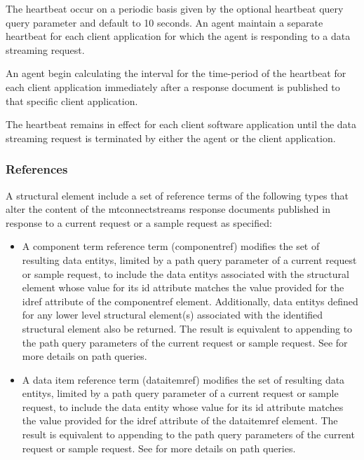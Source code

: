 The \gls{heartbeat} \MUST occur on a periodic basis given by the optional \gls{heartbeat query} query parameter and \MUST default to 10 seconds.  An \gls{agent} \MUST maintain a separate \gls{heartbeat} for each client application for which the \gls{agent} is responding to a \gls{data streaming} \gls{request}.

An \gls{agent} \MUST begin calculating the interval for the time-period of the \gls{heartbeat} for each client application immediately after a \gls{response document} is published to that specific client application.

The \gls{heartbeat} remains in effect for each client software application until the \gls{data streaming} \gls{request} is terminated by either the \gls{agent} or the client application.


\subsubsection{References}
\label{sec:References}

A \gls{structural element} \MAY include a set of \glspl{reference term} of the following types that \MAY alter the content of the \glspl{mtconnectstreams response document} published in response to a \gls{current request} or a \gls{sample request} as specified:

\begin{itemize}
\item A \gls{component term} \gls{reference term} (\gls{componentref}) modifies the set of resulting \glspl{data entity}, limited by a path query parameter of a \gls{current request} or \gls{sample request}, to include the \glspl{data entity} associated with the \gls{structural element} whose value for its \gls{id} attribute matches the value provided for the \gls{idref} attribute of the \gls{componentref} element. Additionally, \glspl{data entity} defined for any \gls{lower level} \gls{structural element}(s) associated with the identified \gls{structural element} \MUST also be returned. The result is equivalent to appending \cfont{//[@id=<"idRef">]} to the path query parameters of the \gls{current request} or \gls{sample request}. See  for more details on path queries.

\item A \gls{data item} \gls{reference term} (\gls{dataitemref}) modifies the set of resulting \glspl{data entity}, limited by a path query parameter of a \gls{current request} or \gls{sample request}, to include the \gls{data entity} whose value for its \gls{id} attribute matches the value provided for the \gls{idref} attribute of the \gls{dataitemref} element. The result is equivalent to appending \cfont{//[@id=<"idRef">]} to the path query parameters of the \gls{current request} or \gls{sample request}. See  for more details on path queries.
\end{itemize}

